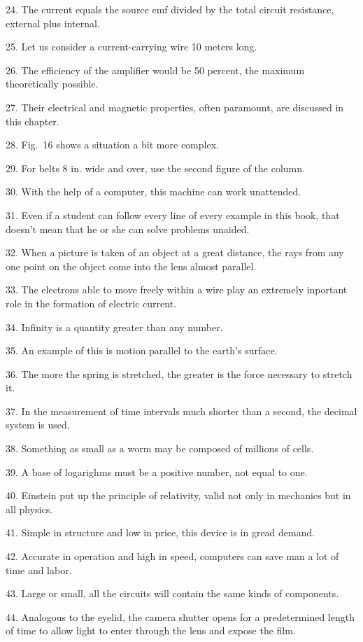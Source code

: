 \documentclass[a4paper,twocolumn,10pt]{article}
\begin{document}
\begin{CJK}{UTF8}{gkai}
	24. The current equals the source emf divided by the total circuit resistance, external plus internal.

	25. Let us consider a current-carrying wire 10 meters long.

	26. The efficiency of the amplifier would be 50 percent, the maximum theoretically possible.

	27. Their electrical and magnetic properties, often paramount, are discussed in this chapter.

	28. Fig.~16 shows a situation a bit more complex.

	29. For belts 8 in. wide and over, use the second figure of the column.

	30. With the help of a computer, this machine can work unattended.

	31. Even if a student can follow every line of every example in this book, that doesn't mean
	that he or she can solve problems unaided.

	32. When a picture is taken of an object at a great distance, the rays from any one point on the
	object come into the lens almost parallel.

	33. The electrons able to move freely within a wire play an extremely inportant role
	in the formation of electric current.

	34. Infinity is a quantity greater than any number.

	35. An example of this is motion parallel to the earth's surface.

	36. The more the spring is stretched, the greater is the force necessary to stretch it.

	37. In the measurement of time intervals much shorter than a second, the decimal system is used.

	38. Something as small as a worm may be composed of millions of cells.

	39. A base of logarighms must be a positive number, not equal to one.

	40. Einstein put up the principle of relativity, valid not only in mechanics but
	in all physics.

	41. Simple in structure and low in price, this device is in gread demand.

	42. Accurate in operation and high in speed, computers can save man a lot of time and labor.

	43. Large or small, all the circuits will contain the same kinds of components.

	44. Analogous to the eyelid, the camera shutter opens for a predetermined length of time
	to allow light to enter through the lens and expose the film.


\end{CJK}
\end{document}
